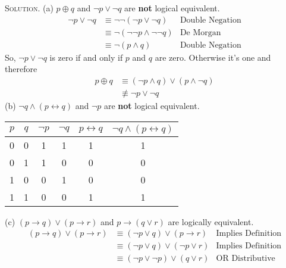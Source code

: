 \documentclass[12pt, a4paper, oneside]{article}
\newenvironment{solution}{\par\noindent\textsc{Solution. }}{\\\par}
\begin{document}
\newpage
\begin{solution}
    \newline (a) $p \oplus q$ and $\neg p \vee \neg q$ are \textbf{not} logical equivalent. 
\begin{align*}
    \neg p \vee \neg q &\equiv \neg \neg \left( \neg p \vee \neg q\right) &\text{Double Negation} \\
                       &\equiv \neg \left(\neg \neg p \wedge \neg \neg q\right) &\text{De Morgan} \\
                       &\equiv \neg \left(p \wedge q\right) &\text{Double Negation} 
\end{align*}
So, $\neg p \vee \neg q$ is zero if and only if $p$ and $q$ are zero. Otherwise it's one and therefore
\begin{align*}
    p \oplus q &\equiv \left( \neg p \wedge q \right) \vee \left( p \wedge \neg q \right) \\
               &\not\equiv \neg p \vee \neg q
\end{align*}
\newline (b) $\neg q \wedge \left( p \leftrightarrow q \right)$ and $\neg p$ are \textbf{not} logical equivalent.
\begin{table}[!htbp]
\begin{tabular}{|c|c|c|c|c|c|}
\hline
$p$ & $q$ & $\neg p$ & $\neg q$ & $p \leftrightarrow q$ & $\neg q\wedge \left(p \leftrightarrow q\right)$ \\ 
\hline
0 & 0 & 1 & 1 & 1 & 1 \\ \hline
0 & 1 & 1 & 0 & 0 & 0 \\ \hline
1 & 0 & 0 & 1 & 0 & 0 \\ \hline
1 & 1 & 0 & 0 & 1 & 1 \\
\hline
\end{tabular}
\end{table}
\newline(c) $\left( p \rightarrow q\right) \vee \left( p \rightarrow r\right)$ and $p \rightarrow \left( q \vee r\right)$ are logically equivalent.
\begin{align*}
    \left( p \rightarrow q\right) \vee \left( p \rightarrow r\right) &\equiv \left(\neg p \vee q\right)
    \vee \left(p \rightarrow r \right) &\text{Implies Definition} \\
    &\equiv \left(\neg p \vee q\right) \vee \left(\neg p \vee r \right)&\text{Implies Definition} \\
    &\equiv \left(\neg p \vee \neg p\right) \vee \left(q \vee r \right)&\text{OR Distributive} \\

\end{align*}
\end{solution}
\end{document}
